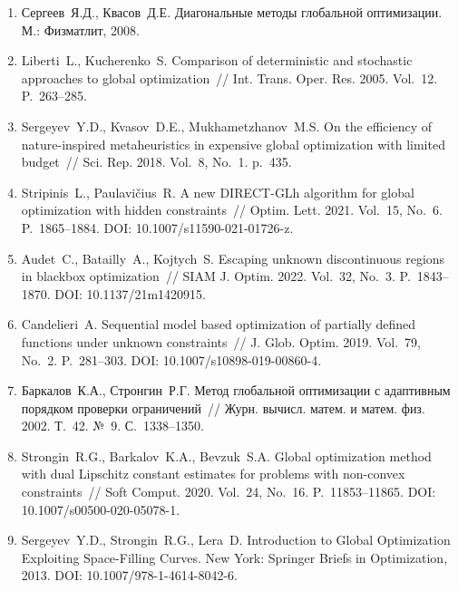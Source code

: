 \documentclass[a4paper,12pt,russian]{article}
\begin{document}
\begin{enumerate}
\item \label{rfa:rulit:Sergeyev2017}
Сергеев~Я.Д., Квасов~Д.Е. Диагональные методы глобальной оптимизации.  М.: Физматлит, 2008. 

\item \label{rfa:rulit:Liberti2005}
Liberti~L., Kucherenko~S. Comparison of deterministic and stochastic approaches to global optimization~// Int. Trans. Oper. Res. 2005. Vol.~12. P.~263--285.

\item \label{rfa:rulit:Sergeyev2018}
Sergeyev~Y.D., Kvasov~D.E., Mukhametzhanov~M.S. On the efficiency of nature-inspired metaheuristics in expensive global optimization with limited budget~// Sci. Rep. 2018. Vol.~8, No.~1. p.~435.

\item \label{rfa:rulit:Stripinis2021}
Stripinis~L., Paulavi{\v c}ius~R. A new {DIRECT}-{GLh} algorithm for global optimization with hidden constraints~// Optim. Lett. 2021. Vol.~15, No.~6. P.~1865--1884.
DOI: 10.1007/s11590-021-01726-z.


\item \label{rfa:rulit:Audet2022}
Audet~C., Batailly~A., Kojtych~S. Escaping unknown discontinuous regions in blackbox optimization~// SIAM J. Optim. 2022. Vol.~32, No.~3. P.~1843--1870. DOI: 10.1137/21m1420915.

\item \label{rfa:rulit:Candelieri2019}
Candelieri~A. Sequential model based optimization of partially defined functions
under unknown constraints~// J. Glob. Optim. 2019. Vol.~79, No.~2. P.~281--303. DOI: 10.1007/s10898-019-00860-4.

\item \label{rfa:rulit:Sergeyev2003}
Баркалов~К.А., Стронгин~Р.Г. Метод глобальной оптимизации с адаптивным порядком проверки ограничений~// Журн. вычисл. матем. и матем. физ. 2002. Т.~42. №~9. С.~1338--1350.

\item \label{rfa:rulit:Strongin2020}
Strongin~R.G., Barkalov~K.A., Bevzuk~S.A. Global optimization method with dual Lipschitz constant estimates for problems with non-convex constraints~//
Soft Comput. 2020. Vol.~24, No.~16. P.~11853--11865. DOI: 10.1007/s00500-020-05078-1.

\item \label{rfa:rulit:Sergeyev2013}
Sergeyev~Y.D., Strongin~R.G., Lera~D. Introduction to Global Optimization Exploiting Space-Filling Curves. New York: Springer Briefs in Optimization, 2013. DOI: 10.1007/978-1-4614-8042-6.


\end{enumerate}
\end{document}
